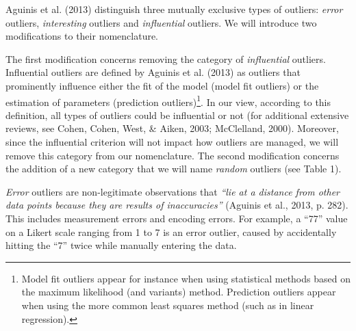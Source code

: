 \documentclass[man,floatsintext]{apa6}
\let\rmarkdownfootnote\footnote%
\def\footnote{\protect\rmarkdownfootnote}
\begin{document}
Aguinis et al. (2013) distinguish three mutually exclusive types of outliers: \emph{error} outliers, \emph{interesting} outliers and \emph{influential} outliers. We will introduce two modifications to their nomenclature.

The first modification concerns removing the category of \emph{influential} outliers. Influential outliers are defined by Aguinis et al. (2013) as outliers that prominently influence either the fit of the model (model fit outliers) or the estimation of parameters (prediction outliers)\footnote{Model fit outliers appear for instance when using statistical methods based on the maximum likelihood (and variants) method. Prediction outliers appear when using the more common least squares method (such as in linear regression).}. In our view, according to this definition, all types of outliers could be influential or not (for additional extensive reviews, see Cohen, Cohen, West, \& Aiken, 2003; McClelland, 2000). Moreover, since the influential criterion will not impact how outliers are managed, we will remove this category from our nomenclature. The second modification concerns the addition of a new category that we will name \emph{random} outliers (see Table 1).

\emph{Error} outliers are non-legitimate observations that \emph{\enquote{lie at a distance from other data points because they are results of inaccuracies}} (Aguinis et al., 2013, p. 282). This includes measurement errors and encoding errors. For example, a \enquote{77} value on a Likert scale ranging from 1 to 7 is an error outlier, caused by accidentally hitting the \enquote{7} twice while manually entering the data.
\end{document}
